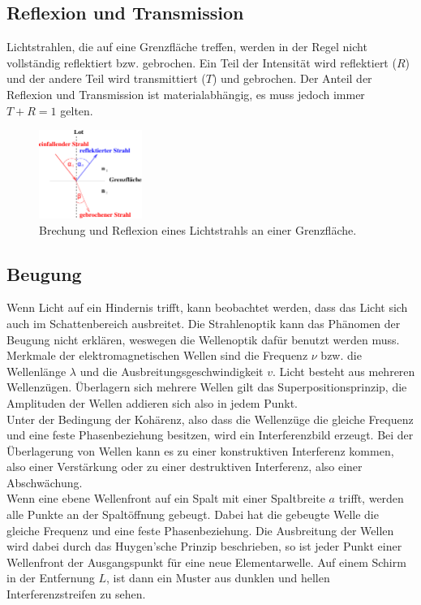 \subsection{Reflexion und Transmission}
\label{subsec:R+T}
    Lichtstrahlen, die auf eine Grenzfläche treffen, werden in der Regel nicht vollständig reflektiert bzw. gebrochen.
    Ein Teil der Intensität wird reflektiert ($R$) und der andere Teil wird transmittiert ($T$) und gebrochen.
    Der Anteil der Reflexion und Transmission ist materialabhängig, es muss jedoch immer $T + R = 1$ gelten.

    \begin{figure}[H]
        \centering
        \includegraphics[width=0.3\textwidth]{build/Abb_2c.pdf}
        \caption {Brechung und Reflexion eines Lichtstrahls an einer Grenzfläche\cite[2]{V400}.}
        \label{fig:Abb_2c}
    \end{figure}

 
\subsection{Beugung}
\label{subsec:Beugung}
Wenn Licht auf ein Hindernis trifft, kann beobachtet werden, dass das Licht sich auch im Schattenbereich ausbreitet.
Die Strahlenoptik kann das Phänomen der Beugung nicht erklären, weswegen die Wellenoptik dafür benutzt werden muss.
Merkmale der elektromagnetischen Wellen sind die Frequenz $\nu$ bzw. die Wellenlänge $\lambda$ und die Ausbreitungsgeschwindigkeit $v$.
Licht besteht aus mehreren Wellenzügen.
Überlagern sich mehrere Wellen gilt das Superpositionsprinzip, die Amplituden der Wellen addieren sich also in jedem Punkt.\\
Unter der Bedingung der Kohärenz, also dass die Wellenzüge die gleiche Frequenz und eine feste Phasenbeziehung besitzen, wird ein Interferenzbild erzeugt.
Bei der Überlagerung von Wellen kann es zu einer konstruktiven Interferenz kommen, also einer  Verstärkung oder zu einer destruktiven
Interferenz, also einer Abschwächung.\\
Wenn eine ebene Wellenfront auf ein Spalt mit einer Spaltbreite $a$ trifft, werden alle Punkte an der Spaltöffnung gebeugt.
Dabei hat die gebeugte Welle die gleiche Frequenz und eine feste Phasenbeziehung.
Die Ausbreitung der Wellen wird dabei durch das Huygen'sche Prinzip beschrieben, so ist jeder Punkt einer Wellenfront der Ausgangspunkt
für eine neue Elementarwelle.
Auf einem Schirm in der Entfernung $L$, ist dann ein Muster aus dunklen und hellen Interferenzstreifen zu sehen.

